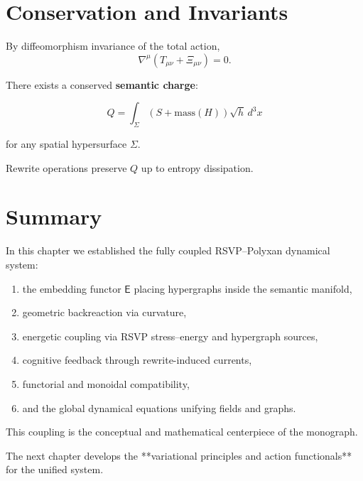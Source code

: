 \section{Conservation and Invariants}

By diffeomorphism invariance of the total action,
\[
\nabla^\mu(T_{\mu\nu}+\Xi_{\mu\nu})=0.
\]

There exists a conserved \textbf{semantic charge}:

\[
Q
=
\int_{\Sigma}
\left(S + \mathrm{mass}(H)\right)
\sqrt{h}\, d^3x
\]

for any spatial hypersurface $\Sigma$.

Rewrite operations preserve $Q$ up to entropy dissipation.


\section{Summary}

In this chapter we established the fully coupled RSVP–Polyxan dynamical system:

\begin{enumerate}
  \item the embedding functor $\mathsf{E}$ placing hypergraphs inside the semantic manifold,
  \item geometric backreaction via curvature,
  \item energetic coupling via RSVP stress–energy and hypergraph sources,
  \item cognitive feedback through rewrite-induced currents,
  \item functorial and monoidal compatibility,
  \item and the global dynamical equations unifying fields and graphs.
\end{enumerate}

This coupling is the conceptual and mathematical centerpiece of the monograph.

The next chapter develops the **variational principles and action functionals** for the unified system.
